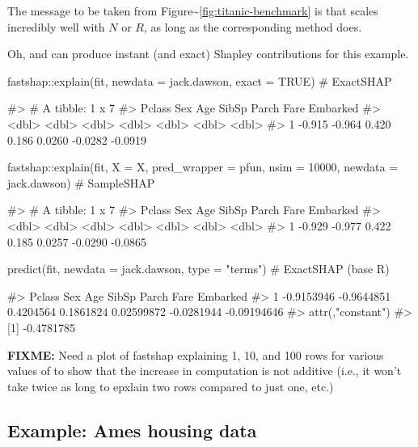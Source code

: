 The message to be taken from
Figure\textasciitilde{}\ref{fig:titanic-benchmark} is that
 scales incredibly well with \(N\) or \(R\), as long as
the corresponding  method does.

Oh, and  can produce instant (and exact) Shapley
contributions for this example.

\begin{Schunk}
\begin{Sinput}
fastshap::explain(fit, newdata = jack.dawson, exact = TRUE)  # ExactSHAP
\end{Sinput}
\begin{Soutput}
#> # A tibble: 1 x 7
#>   Pclass    Sex   Age SibSp  Parch    Fare Embarked
#>    <dbl>  <dbl> <dbl> <dbl>  <dbl>   <dbl>    <dbl>
#> 1 -0.915 -0.964 0.420 0.186 0.0260 -0.0282  -0.0919
\end{Soutput}
\begin{Sinput}
fastshap::explain(fit, X = X, pred_wrapper = pfun, nsim = 10000,
                  newdata = jack.dawson)  # SampleSHAP
\end{Sinput}
\begin{Soutput}
#> # A tibble: 1 x 7
#>   Pclass    Sex   Age SibSp  Parch    Fare Embarked
#>    <dbl>  <dbl> <dbl> <dbl>  <dbl>   <dbl>    <dbl>
#> 1 -0.929 -0.977 0.422 0.185 0.0257 -0.0290  -0.0865
\end{Soutput}
\begin{Sinput}
predict(fit, newdata = jack.dawson, type = "terms")  # ExactSHAP (base R)
\end{Sinput}
\begin{Soutput}
#>       Pclass        Sex       Age     SibSp      Parch       Fare    Embarked
#> 1 -0.9153946 -0.9644851 0.4204564 0.1861824 0.02599872 -0.0281944 -0.09194646
#> attr(,"constant")
#> [1] -0.4781785
\end{Soutput}
\end{Schunk}

\textbf{FIXME:} Need a plot of fastshap explaining 1, 10, and 100 rows
for various values of  to show that the increase in
computation is not additive (i.e., it won't take twice as long to
epxlain two rows compared to just one, etc.)

\hypertarget{example-ames-housing-data}{%
\subsection{Example: Ames housing
data}\label{example-ames-housing-data}}

